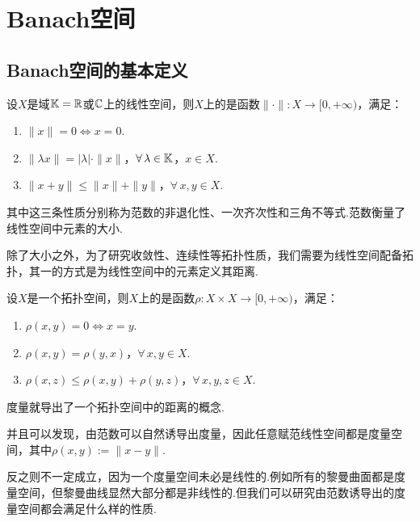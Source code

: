 \chapter{Banach空间}

\section{Banach空间的基本定义}


\begin{definition}[范数]
    设$X$是域$\mathbb{K}=\mathbb{R}$或$\mathbb{C}$上的线性空间，则$X$上的是函数$\|\cdot\|\colon X\to[0,+\infty)$，满足：
    \begin{enumerate}[label=(\roman*)]
        \item $\|x\|=0\iff x=0$.
        \item $\|\lambda x\|=|\lambda|\cdot\|x\|$，$\forall\,\lambda\in\mathbb{K}$，$x\in X$.
        \item $\|x+y\|\leq\|x\|+\|y\|$，$\forall\, x,y\in X$.
    \end{enumerate}
\end{definition}
其中这三条性质分别称为范数的非退化性、一次齐次性和三角不等式.范数衡量了线性空间中元素的大小.\par
除了大小之外，为了研究收敛性、连续性等拓扑性质，我们需要为线性空间配备拓扑，其一的方式是为线性空间中的元素定义其距离.
\begin{definition}[度量]
    设$X$是一个拓扑空间，则$X$上的是函数$\rho: X\times X\to[0,+\infty)$，满足：
    \begin{enumerate}[label=(\roman*)]
        \item $\rho(x,y)=0\iff x=y$.
        \item $\rho(x,y)=\rho(y,x)$，$\forall\, x,y\in X$.
        \item $\rho(x,z)\leq\rho(x,y)+\rho(y,z)$，$\forall\, x,y,z\in X$.
    \end{enumerate}
\end{definition}
度量就导出了一个拓扑空间中的距离的概念.\par
并且可以发现，由范数可以自然诱导出度量，因此任意赋范线性空间都是度量空间，其中$\rho(x,y):=\|x-y\|$.\par
反之则不一定成立，因为一个度量空间未必是线性的.例如所有的黎曼曲面都是度量空间，但黎曼曲线显然大部分都是非线性的.但我们可以研究由范数诱导出的度量空间都会满足什么样的性质.

